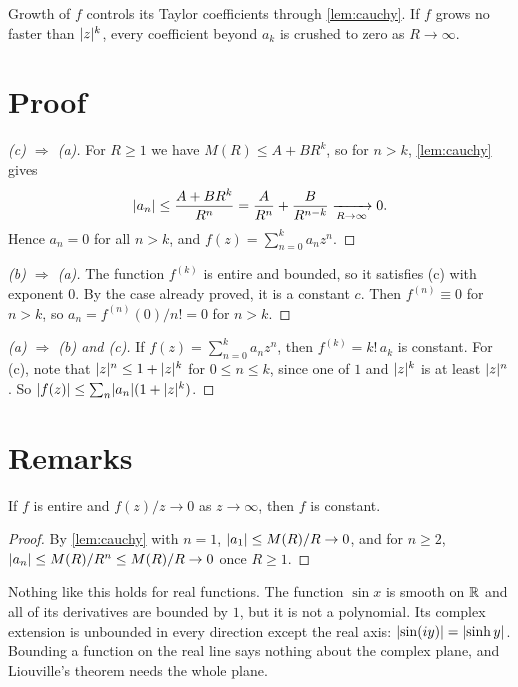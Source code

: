 \documentclass[11pt,a4paper]{article}
\begin{document}
Growth of $f$ controls its Taylor coefficients through \cref{lem:cauchy}. If $f$
grows no faster than $\lvert z\rvert^k$, every coefficient beyond $a_k$ is crushed to zero
as $R \to \infty$.

\section{Proof}

\begin{proof}[(c) $\Rightarrow$ (a)]
  For $R \geq 1$ we have $M(R) \leq A + B R^k$, so for $n > k$, \cref{lem:cauchy} gives
  \[
    \lvert a_n\rvert \leq \frac{A + B R^k}{R^n} = \frac{A}{R^n} + \frac{B}{R^{n-k}}
    \xrightarrow[R \to \infty]{} 0 .
  \]
  Hence $a_n = 0$ for all $n > k$, and $f(z) = \sum_{n=0}^{k} a_n z^n$.
\end{proof}

\begin{proof}[(b) $\Rightarrow$ (a)]
  The function $f^{(k)}$ is entire and bounded, so it satisfies (c) with exponent $0$.
  By the case already proved, it is a constant $c$. Then $f^{(n)} \equiv 0$ for
  $n > k$, so $a_n = f^{(n)}(0)/n! = 0$ for $n > k$.
\end{proof}

\begin{proof}[(a) $\Rightarrow$ (b) and (c)]
  If $f(z) = \sum_{n=0}^{k} a_n z^n$, then $f^{(k)} = k!\, a_k$ is constant. For
  (c), note that $\lvert z\rvert^n \leq 1 + \lvert z\rvert^k$ for $0 \leq n \leq k$, since one of
  $1$ and $\lvert z\rvert^k$ is at least $\lvert z\rvert^n$. So
  $\lvert f(z)\rvert \leq \sum_{n} \lvert a_n\rvert (1 + \lvert z\rvert^k)$.
\end{proof}

\section{Remarks}

\begin{corollary}\label{cor:sublinear}
  If $f$ is entire and $f(z)/z \to 0$ as $z \to \infty$, then $f$ is constant.
\end{corollary}

\begin{proof}
  By \cref{lem:cauchy} with $n = 1$, $\lvert a_1\rvert \leq M(R)/R \to 0$, and for $n \geq 2$,
  $\lvert a_n\rvert \leq M(R)/R^n \leq M(R)/R \to 0$ once $R \geq 1$.
\end{proof}

\begin{remark}
  Nothing like this holds for real functions. The function $\sin x$ is smooth on
  $\mathbb{R}$ and all of its derivatives are bounded by $1$, but it is not a polynomial.
  Its complex extension is unbounded in every direction except the real axis:
  $\lvert\sin(iy)\rvert = \lvert\sinh y\rvert$. Bounding a function on the real line says nothing
  about the complex plane, and Liouville's theorem needs the whole plane.
\end{remark}
\end{document}
